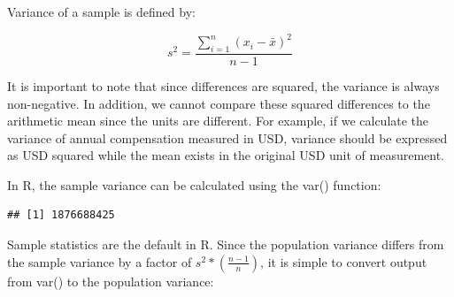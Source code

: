 \documentclass[]{book}
\newenvironment{Shaded}{\begin{snugshade}}{\end{snugshade}}
\newcommand{\CommentTok}[1]{\textcolor[rgb]{0.56,0.35,0.01}{\textit{#1}}}
\newcommand{\DecValTok}[1]{\textcolor[rgb]{0.00,0.00,0.81}{#1}}
\newcommand{\KeywordTok}[1]{\textcolor[rgb]{0.13,0.29,0.53}{\textbf{#1}}}
\newcommand{\NormalTok}[1]{#1}
\newcommand{\OperatorTok}[1]{\textcolor[rgb]{0.81,0.36,0.00}{\textbf{#1}}}
\newcommand{\StringTok}[1]{\textcolor[rgb]{0.31,0.60,0.02}{#1}}
\begin{document}
Variance of a sample is defined by:

\[ s^{2} = \frac{\displaystyle\sum_{i=1}^{n} (x_{i}-\bar{x})^{2}}{n-1} \]

It is important to note that since differences are squared, the variance is always non-negative. In addition, we cannot compare these squared differences to the arithmetic mean since the units are different. For example, if we calculate the variance of annual compensation measured in USD, variance should be expressed as USD squared while the mean exists in the original USD unit of measurement.

In R, the sample variance can be calculated using the var() function:

\begin{Shaded}
\end{Shaded}

\begin{verbatim}
## [1] 1876688425
\end{verbatim}

Sample statistics are the default in R. Since the population variance differs from the sample variance by a factor of \(s^2 * (\frac{n - 1}{n})\), it is simple to convert output from var() to the population variance:

\begin{Shaded}
\end{Shaded}
\end{document}
